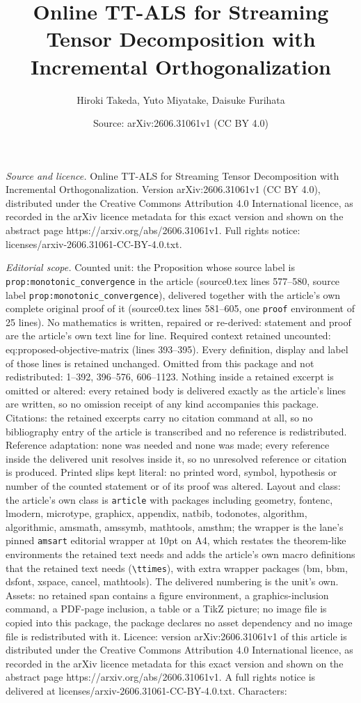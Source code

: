 \documentclass[10pt,a4paper]{amsart}
\title[Online TT-ALS for Streaming Tensor Decomposition with Increm]{Online TT-ALS for Streaming Tensor Decomposition with Incremental Orthogonalization}
\author{Hiroki Takeda, Yuto Miyatake, Daisuke Furihata}
\date{Source: arXiv:2606.31061v1 (CC BY 4.0)}
\begin{document}
\maketitle

\noindent\emph{Source and licence.} Online TT-ALS for Streaming Tensor Decomposition with Incremental Orthogonalization. Version arXiv:2606.31061v1 (CC BY 4.0), distributed under the Creative Commons Attribution 4.0 International licence, as recorded in the arXiv licence metadata for this exact version and shown on the abstract page https://arxiv.org/abs/2606.31061v1. Full rights notice: licenses/arxiv-2606.31061-CC-BY-4.0.txt.\par\smallskip

\noindent\textit{Editorial scope.} Counted unit: the Proposition whose source label is \texttt{prop:monotonic\_convergence} in the article (source0.tex lines 577--580, source label \texttt{prop:monotonic\_convergence}), delivered together with the article's own complete original proof of it (source0.tex lines 581--605, one \texttt{proof} environment of 25 lines). No mathematics is written, repaired or re-derived: statement and proof are the article's own text line for line. Required context retained uncounted: eq:proposed-objective-matrix (lines 393--395). Every definition, display and label of those lines is retained unchanged. Omitted from this package and not redistributed: 1--392, 396--576, 606--1123. Nothing inside a retained excerpt is omitted or altered: every retained body is delivered exactly as the article's lines are written, so no omission receipt of any kind accompanies this package. Citations: the retained excerpts carry no citation command at all, so no bibliography entry of the article is transcribed and no reference is redistributed. Reference adaptation: none was needed and none was made; every reference inside the delivered unit resolves inside it, so no unresolved reference or citation is produced. Printed slips kept literal: no printed word, symbol, hypothesis or number of the counted statement or of its proof was altered. Layout and class: the article's own class is \texttt{article} with packages including geometry, fontenc, lmodern, microtype, graphicx, appendix, natbib, todonotes, algorithm, algorithmic, amsmath, amssymb, mathtools, amsthm; the wrapper is the lane's pinned \texttt{amsart} editorial wrapper at 10pt on A4, which restates the theorem-like environments the retained text needs and adds the article's own macro definitions that the retained text needs (\texttt{\textbackslash ttimes}), with extra wrapper packages (bm, bbm, dsfont, xspace, cancel, mathtools). The delivered numbering is the unit's own. Assets: no retained span contains a figure environment, a graphics-inclusion command, a PDF-page inclusion, a table or a TikZ picture; no image file is copied into this package, the package declares no asset dependency and no image file is redistributed with it. Licence: version arXiv:2606.31061v1 of this article is distributed under the Creative Commons Attribution 4.0 International licence, as recorded in the arXiv licence metadata for this exact version and shown on the abstract page https://arxiv.org/abs/2606.31061v1. A full rights notice is delivered at licenses/arxiv-2606.31061-CC-BY-4.0.txt. Characters: 
\end{document}
